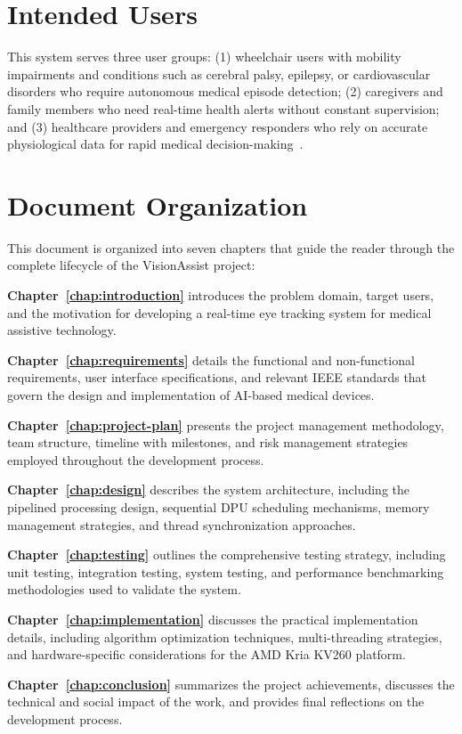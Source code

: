 \section{Intended Users}\label{sec:intended-users}

This system serves three user groups: (1) wheelchair users with mobility impairments and conditions such as cerebral palsy, epilepsy, or cardiovascular disorders who require autonomous medical episode detection; (2) caregivers and family members who need real-time health alerts without constant supervision; and (3) healthcare providers and emergency responders who rely on accurate physiological data for rapid medical decision-making~\cite{beauchamp2007ethics}.

\section{Document Organization}\label{sec:document-organization}

This document is organized into seven chapters that guide the reader through the complete lifecycle of the VisionAssist project:

\textbf{Chapter~\ref{chap:introduction}} introduces the problem domain, target users, and the motivation for developing a real-time eye tracking system for medical assistive technology.

\textbf{Chapter~\ref{chap:requirements}} details the functional and non-functional requirements, user interface specifications, and relevant IEEE standards that govern the design and implementation of AI-based medical devices.

\textbf{Chapter~\ref{chap:project-plan}} presents the project management methodology, team structure, timeline with milestones, and risk management strategies employed throughout the development process.

\textbf{Chapter~\ref{chap:design}} describes the system architecture, including the pipelined processing design, sequential DPU scheduling mechanisms, memory management strategies, and thread synchronization approaches.

\textbf{Chapter~\ref{chap:testing}} outlines the comprehensive testing strategy, including unit testing, integration testing, system testing, and performance benchmarking methodologies used to validate the system.

\textbf{Chapter~\ref{chap:implementation}} discusses the practical implementation details, including algorithm optimization techniques, multi-threading strategies, and hardware-specific considerations for the AMD Kria KV260 platform.

\textbf{Chapter~\ref{chap:conclusion}} summarizes the project achievements, discusses the technical and social impact of the work, and provides final reflections on the development process.

